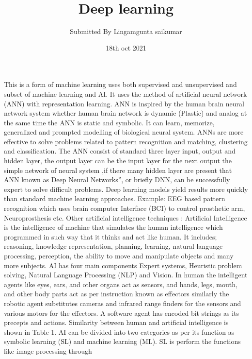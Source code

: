 \documentclass{article}
\title{Deep learning}
\author{Submitted By Lingamgunta saikumar}
\date{18th oct 2021}
\begin{document}
\maketitle

\section{}
This is a form of machine learning uses both supervised and unsupervised and subset of 
machine learning and AI. It uses the method of artificial neural network (ANN) with 
representation learning. ANN is inspired by the human brain neural network system 
whether human brain network is dynamic (Plastic) and analog at the same time the ANN 
is static and symbolic. It can learn, memorize, generalized and prompted modelling of 
biological neural system. ANNs are more effective to solve problems related to pattern 
recognition and matching, clustering and classification. The ANN consist of standard three 
layer input, output and hidden layer, the output layer can be the input layer for the next 
output the simple network of neural system ,if there many hidden layer are present that 
ANN known as Deep Neural Networks”, or briefly DNN, can be successfully expert to solve 
difficult problems. Deep learning models yield results more quickly than standard machine 
learning approaches. 
Example: EEG based pattern recognition which uses brain computer Interface (BCI) to 
control prosthetic arm, Neuroprosthesis etc.
Other artificial intelligence techniques :
Artificial Intelligence is the intelligence of machine that simulates the human intelligence 
which programmed in such way that it thinks and act like human. It includes; reasoning, 
knowledge representation, planning, learning, natural language processing, perception, 
the ability to move and manipulate objects and many more subjects. AI has four main 
components Expert systems, Heuristic problem solving, Natural Language Processing (NLP) 
and Vision. In human the intelligent agents like eyes, ears, and other organs act as 
sensors, and hands, legs, mouth, and other body parts act as per instruction known as 
effectors similarly the robotic agent substitutes cameras and infrared range finders for the 
sensors and various motors for the effectors. A software agent has encoded bit strings as 
its precepts and actions. Similarity between human and artificial intelligence is shown in 
Table 1. AI can be divided into two categories as per its function as symbolic learning (SL) 
and machine learning (ML). SL is perform the functions like image processing through 
\end{document}

